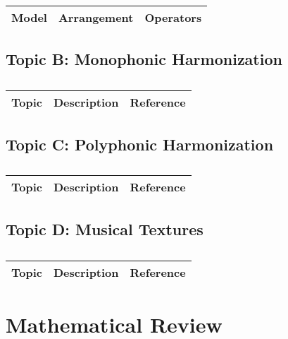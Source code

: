 \centering	
\begin{table}[H]\tiny
	\caption{}	
	\begin{tabular}{r|p{4cm}|l}
		\hline	
		Model & Arrangement & Operators \\
		\hline 
		\hline 
	\end{tabular}
\end{table}

\subsection{Topic B: Monophonic Harmonization}

\centering	
\begin{table}[H]\tiny
	\caption{}	
	\begin{tabular}{r|p{4cm}|l}
		\hline	
		Topic & Description & Reference \\
		\hline 
		\hline 
	\end{tabular}
\end{table}

\subsection{Topic C: Polyphonic Harmonization}

\centering	
\begin{table}[H]\tiny
	\caption{}	
	\begin{tabular}{r|p{4cm}|l}
		\hline	
		Topic & Description & Reference \\
		\hline 
		\hline 
	\end{tabular}
\end{table}

\subsection{Topic D: Musical Textures}

\centering	
\begin{table}[H]\tiny
	\caption{}	
	\begin{tabular}{r|p{4cm}|l}
		\hline	
		Topic & Description & Reference \\
		\hline 
		\hline 
	\end{tabular}
\end{table}


\section{Mathematical Review}

